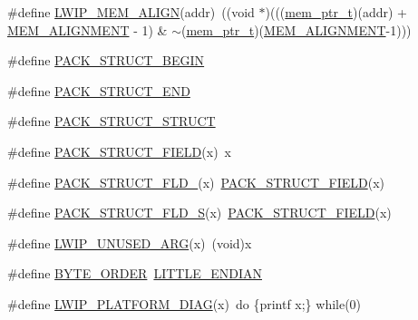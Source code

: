 \begin{DoxyCompactItemize}
\#define \hyperlink{group__compiler__abstraction_gaa8e8724eb1c220cbbb90de9e175ce1dc}{L\+W\+I\+P\+\_\+\+M\+E\+M\+\_\+\+A\+L\+I\+GN}(addr)~((void $\ast$)(((\hyperlink{group__compiler__abstraction_gaf019cbb71af10dcfda7758b21e655307}{mem\+\_\+ptr\+\_\+t})(addr) + \hyperlink{group__lwip__opts__mem_ga97343214666ee6dcb18c0bd77b441ea7}{M\+E\+M\+\_\+\+A\+L\+I\+G\+N\+M\+E\+NT} -\/ 1) \& $\sim$(\hyperlink{group__compiler__abstraction_gaf019cbb71af10dcfda7758b21e655307}{mem\+\_\+ptr\+\_\+t})(\hyperlink{group__lwip__opts__mem_ga97343214666ee6dcb18c0bd77b441ea7}{M\+E\+M\+\_\+\+A\+L\+I\+G\+N\+M\+E\+NT}-\/1)))
\item 
\#define \hyperlink{group__compiler__abstraction_ga73199061891adf1b912d20835c7d5e96}{P\+A\+C\+K\+\_\+\+S\+T\+R\+U\+C\+T\+\_\+\+B\+E\+G\+IN}
\item 
\#define \hyperlink{group__compiler__abstraction_ga465fef70f294e21cbf4ea51fc342f20e}{P\+A\+C\+K\+\_\+\+S\+T\+R\+U\+C\+T\+\_\+\+E\+ND}
\item 
\#define \hyperlink{group__compiler__abstraction_ga9ebc500530d0d9e6cd0b81969f48bbc8}{P\+A\+C\+K\+\_\+\+S\+T\+R\+U\+C\+T\+\_\+\+S\+T\+R\+U\+CT}
\item 
\#define \hyperlink{group__compiler__abstraction_gaab0b988124e37a978d9a88e7c1c778e0}{P\+A\+C\+K\+\_\+\+S\+T\+R\+U\+C\+T\+\_\+\+F\+I\+E\+LD}(x)~x
\item 
\#define \hyperlink{group__compiler__abstraction_gaa8f75e4117374c2d09fbda5566e40b62}{P\+A\+C\+K\+\_\+\+S\+T\+R\+U\+C\+T\+\_\+\+F\+L\+D\+\_}(x)~\hyperlink{group__compiler__abstraction_gaab0b988124e37a978d9a88e7c1c778e0}{P\+A\+C\+K\+\_\+\+S\+T\+R\+U\+C\+T\+\_\+\+F\+I\+E\+LD}(x)
\item 
\#define \hyperlink{group__compiler__abstraction_gacc89e224363eb0ebca24b64d925c3cb7}{P\+A\+C\+K\+\_\+\+S\+T\+R\+U\+C\+T\+\_\+\+F\+L\+D\+\_\+S}(x)~\hyperlink{group__compiler__abstraction_gaab0b988124e37a978d9a88e7c1c778e0}{P\+A\+C\+K\+\_\+\+S\+T\+R\+U\+C\+T\+\_\+\+F\+I\+E\+LD}(x)
\item 
\#define \hyperlink{group__compiler__abstraction_ga70624a5deb8b9199406372a7f3603ecf}{L\+W\+I\+P\+\_\+\+U\+N\+U\+S\+E\+D\+\_\+\+A\+RG}(x)~(void)x
\item 
\#define \hyperlink{group__compiler__abstraction_ga1771b7fb65ee640524d0052f229768c3}{B\+Y\+T\+E\+\_\+\+O\+R\+D\+ER}~\hyperlink{openmote-cc2538_2lwip_2src_2include_2lwip_2arch_8h_a8782a401fbf55261460863fc2f8df1ce}{L\+I\+T\+T\+L\+E\+\_\+\+E\+N\+D\+I\+AN}
\item 
\#define \hyperlink{group__compiler__abstraction_gaccef167be13a500ce30036030a9b142b}{L\+W\+I\+P\+\_\+\+P\+L\+A\+T\+F\+O\+R\+M\+\_\+\+D\+I\+AG}(x)~do \{printf x;\} while(0)

\end{DoxyCompactItemize}
